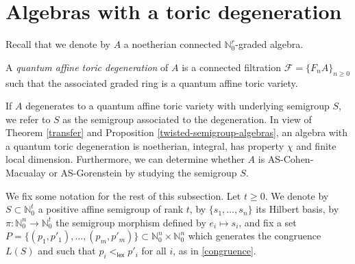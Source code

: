 \documentclass[11pt,fleqn]{article}
\newcommand\NN{\mathbb N}
\renewcommand\to{\longrightarrow}
\newcommand\F{\mathcal F}
\DeclareMathOperator\lex{\mathsf{lex}}
\begin{document}
\section{Algebras with a toric degeneration}
\label{algebras-with-qatd}

Recall that we denote by $A$ a noetherian connected $\NN_0^r$-graded algebra.
\begin{Definition}
A \emph{quantum affine toric degeneration} of $A$ is a connected filtration $\F = 
\{F_n A\}_{n \geq 0}$ such that the associated graded ring is a quantum affine toric
variety. 
\end{Definition}
If $A$ degenerates to a quantum affine toric variety with underlying semigroup $S$, we 
refer to $S$ as the semigroup associated to the degeneration. In view of Theorem 
\ref{transfer} and Proposition \ref{twisted-semigroup-algebras}, an algebra with a 
quantum toric degeneration is noetherian, integral, has property $\chi$ and finite local 
dimension. Furthermore, we can determine whether $A$ is AS-Cohen-Macualay or 
AS-Gorenstein by studying the semigroup $S$.

We fix some notation for the rest of this subsection. Let $t \geq 0$. We denote by $S 
\subset \NN_0^t$ a positive affine semigroup of rank $t$, by $\{s_1, \ldots, s_n\}$ its 
Hilbert basis, by $\pi: \NN_0^n \to \NN_0^t$ the semigroup morphism defined by 
$e_i \longmapsto s_i$, and fix a set $P = \{(p_1, p'_1), \ldots, (p_m, p'_m)\} \subset 
\NN_0^n \times \NN_0^n$ which generates the congruence $L(S)$ and such that $p_i 
<_{\lex} p'_i$ for all $i$, as in \ref{congruence}.
\end{document}
